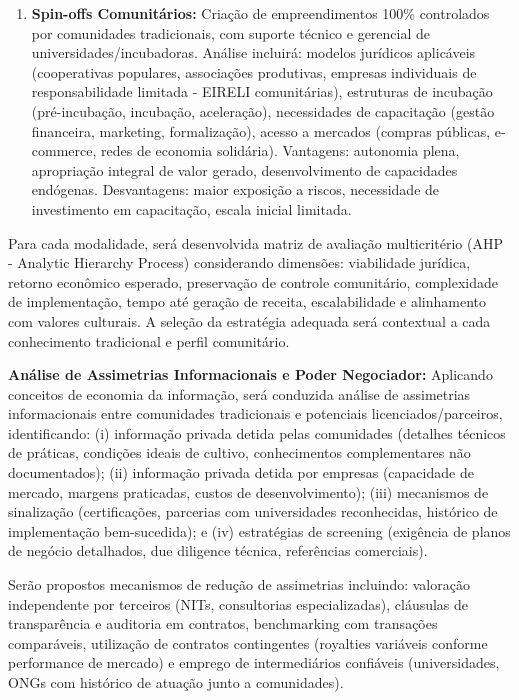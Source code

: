 \begin{enumerate}
\item \textbf{Spin-offs Comunitários:} Criação de empreendimentos 100\% controlados por comunidades tradicionais, com suporte técnico e gerencial de universidades/incubadoras. Análise incluirá: modelos jurídicos aplicáveis (cooperativas populares, associações produtivas, empresas individuais de responsabilidade limitada - EIRELI comunitárias), estruturas de incubação (pré-incubação, incubação, aceleração), necessidades de capacitação (gestão financeira, marketing, formalização), acesso a mercados (compras públicas, e-commerce, redes de economia solidária). Vantagens: autonomia plena, apropriação integral de valor gerado, desenvolvimento de capacidades endógenas. Desvantagens: maior exposição a riscos, necessidade de investimento em capacitação, escala inicial limitada.
\end{enumerate}

Para cada modalidade, será desenvolvida matriz de avaliação multicritério (AHP - Analytic Hierarchy Process) considerando dimensões: viabilidade jurídica, retorno econômico esperado, preservação de controle comunitário, complexidade de implementação, tempo até geração de receita, escalabilidade e alinhamento com valores culturais. A seleção da estratégia adequada será contextual a cada conhecimento tradicional e perfil comunitário.

\textbf{Análise de Assimetrias Informacionais e Poder Negociador:} Aplicando conceitos de economia da informação, será conduzida análise de assimetrias informacionais entre comunidades tradicionais e potenciais licenciados/parceiros, identificando: (i) informação privada detida pelas comunidades (detalhes técnicos de práticas, condições ideais de cultivo, conhecimentos complementares não documentados); (ii) informação privada detida por empresas (capacidade de mercado, margens praticadas, custos de desenvolvimento); (iii) mecanismos de sinalização (certificações, parcerias com universidades reconhecidas, histórico de implementação bem-sucedida); e (iv) estratégias de screening (exigência de planos de negócio detalhados, due diligence técnica, referências comerciais).

Serão propostos mecanismos de redução de assimetrias incluindo: valoração independente por terceiros (NITs, consultorias especializadas), cláusulas de transparência e auditoria em contratos, benchmarking com transações comparáveis, utilização de contratos contingentes (royalties variáveis conforme performance de mercado) e emprego de intermediários confiáveis (universidades, ONGs com histórico de atuação junto a comunidades).

